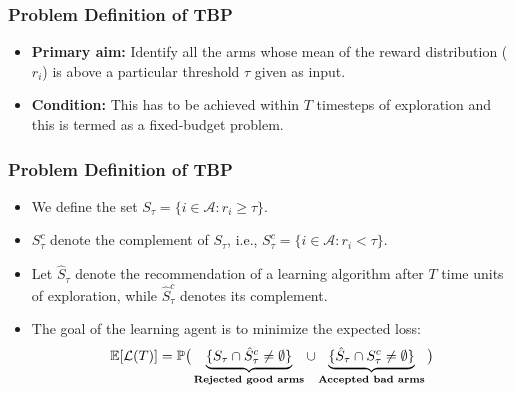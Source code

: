 \begin{frame}
\frametitle{Problem Definition of TBP}
\begin{itemize}
\item<1-> \textbf{Primary aim:} Identify all the arms whose mean of the reward distribution ($r_i$) is above a particular threshold $\tau$ given as input.
\item<2-> \textbf{Condition:} This has to be achieved within $T$ timesteps of exploration and this is termed as a fixed-budget problem.
\end{itemize}
\end{frame}

\begin{frame}
\frametitle{Problem Definition of TBP}
\begin{itemize}
\item<1-> We define the set $S_{\tau}=\lbrace i\in \mathcal{A}: r_{i}\geq \tau \rbrace$. 
\item<2-> $S_\tau^c$ denote the complement of $S_\tau$, i.e.,  $S_{\tau}^{c}=\lbrace i\in \mathcal{A}: r_{i} < \tau \rbrace$. 
\item<3-> Let $\hat{S}_{\tau}$ denote the recommendation of a learning algorithm after $T$ time units of exploration, while $\hat{S}_{\tau}^c$ denotes its complement.


\item<4-> The goal of the learning agent is to minimize the expected loss:
\begin{align*}
\mathbb{E}[\mathcal{L}(T)] &= \mathbb{P}\big(\underbrace{\lbrace S_{\tau}\cap \hat{S}_{\tau}^{c} \neq \emptyset \rbrace}_{\textbf{Rejected good arms}}  \cup   \underbrace{\lbrace \hat{S}_{\tau}\cap S_{\tau}^{c} \neq \emptyset\rbrace}_{\textbf{Accepted bad arms}}\big) \\
\end{align*}
\end{itemize}
\end{frame}

